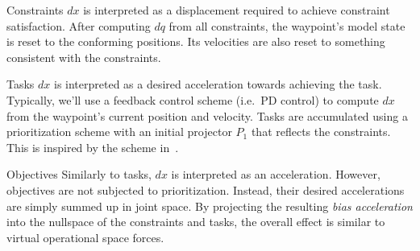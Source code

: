 \documentclass{article}
\begin{document}
\begin{compactdesc}
\item[Constraints]
  $dx$ is interpreted as a displacement required to achieve constraint satisfaction.
  After computing $dq$ from all constraints, the waypoint's model state is reset to the conforming positions.
  Its velocities are also reset to something consistent with the constraints.
\item[Tasks]
  $dx$ is interpreted as a desired acceleration towards achieving the task.
  Typically, we'll use a feedback control scheme (i.e.\ PD control) to compute $dx$ from the waypoint's current position and velocity.
  Tasks are accumulated using a prioritization scheme with an initial projector $P_1$ that reflects the constraints.
  This is inspired by the scheme in~\cite{baerlocher:2001}.
\item[Objectives]
  Similarly to tasks, $dx$ is interpreted as an acceleration.
  However, objectives are not subjected to prioritization.
  Instead, their desired accelerations are simply summed up in joint space.
  By projecting the resulting \emph{bias acceleration} into the nullspace of the constraints and tasks, the overall effect is similar to virtual operational space forces.
\end{compactdesc}



\footnotesize


\end{document}
